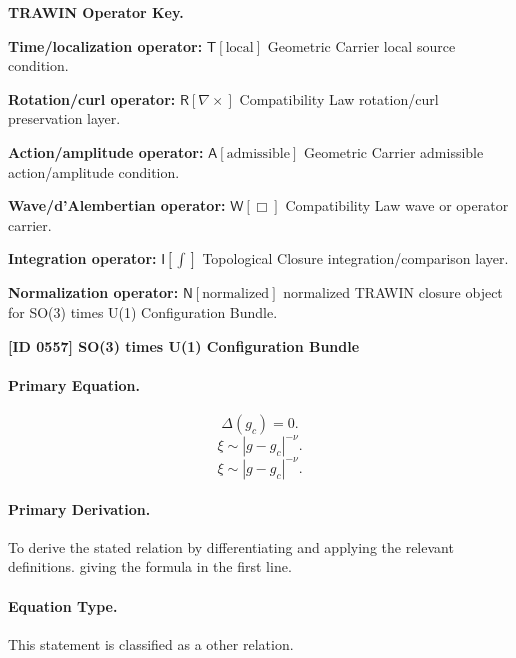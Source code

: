 \par\vspace{0.45\baselineskip}
\noindent\begin{minipage}[t]{\linewidth}
\begingroup
\small
\raggedright
\textbf{TRAWIN Operator Key.}\par
\noindent\textbf{Time/localization operator:} $\mathsf{T}\!\left[\mathrm{local}\right]$ Geometric Carrier local source condition.\par
\noindent\textbf{Rotation/curl operator:} $\mathsf{R}\!\left[\nabla\times\right]$ Compatibility Law rotation/curl preservation layer.\par
\noindent\textbf{Action/amplitude operator:} $\mathsf{A}\!\left[\mathrm{admissible}\right]$ Geometric Carrier admissible action/amplitude condition.\par
\noindent\textbf{Wave/d'Alembertian operator:} $\mathsf{W}\!\left[\Box\right]$ Compatibility Law wave or operator carrier.\par
\noindent\textbf{Integration operator:} $\mathsf{I}\!\left[\int\right]$ Topological Closure integration/comparison layer.\par
\noindent\textbf{Normalization operator:} $\mathsf{N}\!\left[\mathrm{normalized}\right]$ normalized TRAWIN closure object for SO(3) times U(1) Configuration Bundle.\par
\endgroup
\end{minipage}

\clearpage
\noindent\textbf{[ID 0557] SO(3) times U(1) Configuration Bundle}\par
\vspace{0.35em}
\paragraph{Primary Equation.}
\[
\Delta(g_c)=0.
\]
\[
\xi \sim |g-g_c|^{-\nu}.
\]
\[
\boxed{ \xi \sim |g-g_c|^{-\nu}. }
\]

\paragraph{Primary Derivation.}
To derive the stated relation by differentiating and applying the relevant definitions. giving the formula in the first line.
\paragraph{Equation Type.}
This statement is classified as a other relation.

